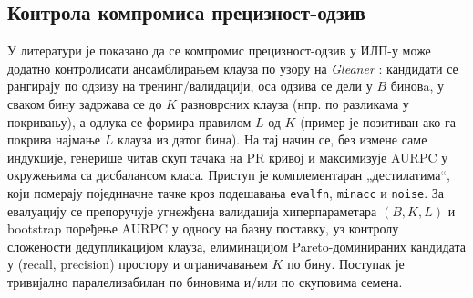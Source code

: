 \subsection{Контрола компромиса прецизност-одзив}

У литератури је показано да се компромис прецизност-одзив у ИЛП-у може додатно контролисати ансамблирањем клауза по узору на \emph{Gleaner} \cite{Goadrich2006Gleaner}: кандидати се рангирају по одзиву на тренинг/валидацији, оса одзива се дели у $B$ биновa, у сваком бину задржава се до $K$ разноврсних клауза (нпр. по разликама у покривању), а одлука се формира правилом $L$-од-$K$ (пример је позитиван ако га покрива најмање $L$ клауза из датог бина). На тај начин се, без измене саме индукције, генерише читав скуп тачака на PR кривој и максимизује AURPC у окружењима са дисбалансом класа. Приступ је комплементаран „дестилатима“, који померају појединачне тачке кроз подешавања \texttt{evalfn}, \texttt{minacc} и \texttt{noise}. За евалуацију се препоручује угнежђена валидација хиперпараметара $(B,K,L)$ и bootstrap поређење AURPC у односу на базну поставку, уз контролу сложености дедупликацијом клауза, елиминацијом Pareto-доминираних кандидата у (recall, precision) простору и ограничавањем $K$ по бину. Поступак је тривијално паралелизабилан по биновима и/или по скуповима семена. 
